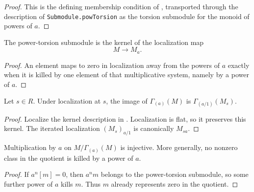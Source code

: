 \begin{proof}
  \leanok
  This is the defining membership condition of
  , transported through the description of
  \texttt{Submodule.powTorsion} as the torsion submodule for the monoid of
  powers of $a$.
\end{proof}

\begin{lemma}
  \label{lemma:nagata-power-torsion-kernel-localization}
  \leanok

  The power-torsion submodule is the kernel of the localization map
  \[
    M\longrightarrow M_a.
  \]
\end{lemma}

\begin{proof}
  \leanok
  An element maps to zero in localization away from the powers of $a$ exactly
  when it is killed by one element of that multiplicative system, namely by a
  power of $a$.
\end{proof}

\begin{lemma}
  \label{lemma:nagata-power-torsion-localization}
  \leanok

  Let $s\in R$.  Under localization at $s$, the image of
  $\Gamma_{(a)}(M)$ is
  $\Gamma_{(a/1)}(M_s)$.
\end{lemma}

\begin{proof}
  \leanok
  Localize the kernel description in
  .  Localization is flat,
  so it preserves this kernel.  The iterated localization $(M_s)_{a/1}$ is
  canonically $M_{sa}$.
\end{proof}

\begin{lemma}
  \label{lemma:nagata-power-torsion-quotient-torsionfree}
  \leanok

  Multiplication by $a$ on $M/\Gamma_{(a)}(M)$ is injective.  More generally,
  no nonzero class in the quotient is killed by a power of $a$.
\end{lemma}

\begin{proof}
  \leanok
  If $a^n[m]=0$, then $a^nm$ belongs to the power-torsion submodule, so some
  further power of $a$ kills $m$.  Thus $m$ already represents zero in the
  quotient.
\end{proof}

